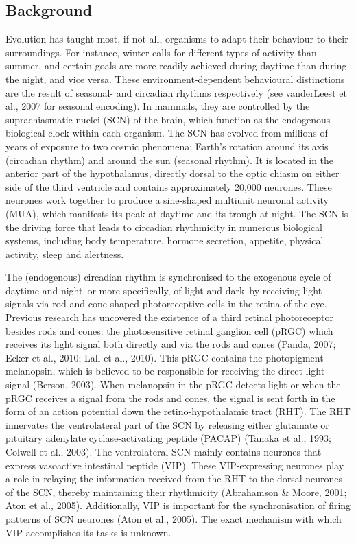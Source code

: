 \begin{multicols}{2}%
 \section{Background}
 

Evolution has taught most, if not all, organisms to adapt their behaviour to their surroundings. For instance, winter calls for different types of activity than summer, and certain goals are more readily achieved during daytime than during the night, and vice versa. These environment-dependent behavioural distinctions are the result of seasonal- and circadian rhythms respectively (see vanderLeest et al., 2007 for seasonal encoding). In mammals, they are controlled by the suprachiasmatic nuclei (SCN) of the brain, which function as the endogenous biological clock within each organism. The SCN has evolved from millions of years of exposure to two cosmic phenomena: Earth's rotation around its axis (circadian rhythm) and around the sun (seasonal rhythm). It is located in the anterior part of the hypothalamus, directly dorsal to the optic chiasm on either side of the third ventricle and contains approximately 20,000 neurones. These neurones work together to produce a sine-shaped multiunit neuronal activity (MUA), which manifests its peak at daytime and its trough at night. The SCN is the driving force that leads to circadian rhythmicity in numerous biological systems, including body temperature, hormone secretion, appetite, physical activity, sleep and alertness.   

The (endogenous) circadian rhythm is synchronised to the exogenous cycle of daytime and night--or more specifically, of light and dark--by receiving  light signals via rod and cone shaped photoreceptive cells in the retina of the eye. Previous research has uncovered the existence of a third retinal photoreceptor besides rods and cones: the photosensitive retinal ganglion cell (pRGC) which receives its light signal both directly and via the rods and cones  (Panda, 2007; Ecker et al., 2010; Lall et al., 2010). This pRGC contains the photopigment melanopsin, which is believed to be responsible for receiving the direct light signal (Berson, 2003). When melanopsin in the pRGC detects light or when the pRGC receives a signal from the rods and cones, the signal is sent forth in the form of an action potential down the retino-hypothalamic tract (RHT). The RHT innervates the ventrolateral part of the SCN by releasing either glutamate or pituitary adenylate cyclase-activating peptide (PACAP) (Tanaka et al., 1993; Colwell et al., 2003). The ventrolateral SCN mainly contains neurones that express vasoactive intestinal peptide (VIP). These VIP-expressing neurones play a role in relaying the information received from the RHT to the dorsal neurones of the SCN, thereby maintaining their rhythmicity (Abrahamson &  Moore, 2001; Aton et al., 2005). Additionally, VIP is important for the synchronisation of firing patterns of SCN neurones (Aton et al., 2005). The exact mechanism with which VIP accomplishes its tasks is unknown.


\end{multicols}
